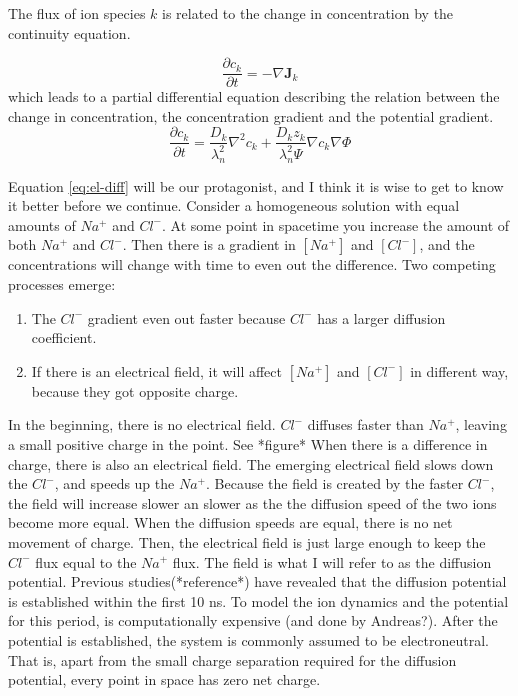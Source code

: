 \documentclass{article}
\begin{document}
The flux  of ion species $k$ is related to the change in concentration by the continuity equation. 

\begin{equation}
\frac{\partial c_k}{\partial t} = -\nabla \bm{J}_k
\end{equation}
which leads to a partial differential equation describing the relation between the change in concentration, the concentration gradient and the potential gradient.
 \begin{equation}\label{eq:el-diff}
\frac{\partial c_k}{\partial t}  = \frac{D_k}{\lambda_n^2}\nabla^2 c_k +\frac{D_k z_k}{\lambda_n^2 \Psi}\nabla c_k  \nabla \Phi
\end{equation}

Equation \ref{eq:el-diff} will be our protagonist, and I think it is wise to get to know it better before we continue. Consider a homogeneous solution with equal amounts of $Na^+$ and $Cl^-$. At some point in spacetime you increase the amount of both $Na^+$ and $Cl^-$. Then there is a gradient in $[Na^+]$ and $[Cl^-]$, and the concentrations will change with time to even out the difference. Two competing processes emerge:
\begin{enumerate}
\item The $Cl^-$ gradient even out faster because $Cl^-$ has a larger diffusion coefficient. 
\item If there is an electrical field, it will affect  $[Na^+]$ and $[Cl^-]$ in different way, because they got opposite charge.
\end{enumerate}

In the beginning, there is no electrical field. $Cl^-$ diffuses faster than $Na^+$, leaving a small positive charge in the point. See *figure* When there is a difference in charge, there is also an electrical field. The emerging electrical field slows down the $Cl^-$, and speeds up the $Na^+$. Because the field is created by the faster $Cl^-$, the field will increase slower an slower as the  the diffusion speed of the two ions become more equal. When the diffusion speeds are equal, there is no net movement of charge. Then, the electrical field is just large enough to keep the $Cl^-$ flux equal to the $Na^+$ flux. The field is what I will refer to as the diffusion potential. Previous studies(*reference*) have revealed that the diffusion potential is established within the first 10 ns. To model the ion dynamics and the potential for this period, is computationally expensive (and done by Andreas?). After the potential is established, the system is commonly assumed to be electroneutral. That is, apart from the small charge separation required for the diffusion potential, every point in space has zero net charge. 
\end{document}
